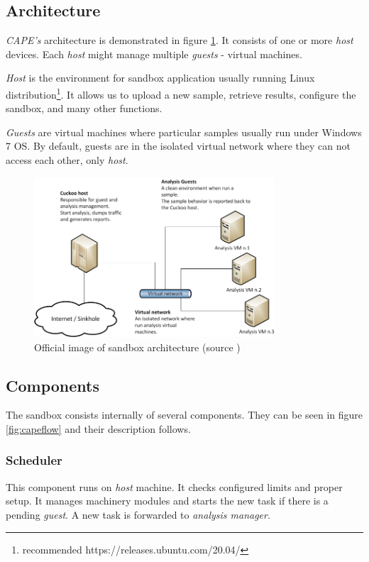 \subsection{Architecture}
\emph{CAPE's} architecture is demonstrated in figure \ref{fig:capearchitecture}. It consists of one or more \emph{host} devices. Each \emph{host} might manage multiple \emph{guests} - virtual machines. 

\emph{Host} is the environment for sandbox application usually running Linux distribution\footnote{recommended https://releases.ubuntu.com/20.04/}. It allows us to upload a new sample, retrieve results, configure the sandbox, and many other functions.

\emph{Guests} are virtual machines where particular samples usually run under Windows 7 OS. By default, guests are in the isolated virtual network where they can not access each other, only \emph{host}.

\begin{figure}[h]
  \centering
  \includegraphics[width=0.8\textwidth]{figures/architecture.png}
  \caption{Official image of sandbox architecture (source \cite{CAPESand75:online})}
  \label{fig:capearchitecture}
\end{figure}


\subsection{Components}
The sandbox consists internally of several components. They can be seen in figure \ref{fig:capeflow} and their description follows.

\subsubsection*{Scheduler}
This component runs on \emph{host} machine. It checks configured limits and proper setup. It manages machinery modules and starts the new task if there is a pending \emph{guest}. A new task is forwarded to \emph{analysis manager}.

